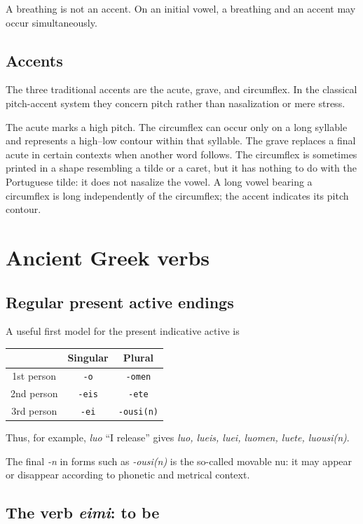 A breathing is not an accent.  On an initial vowel, a breathing and an accent
may occur simultaneously.

\subsection{Accents}
\label{subsection-accents}

The three traditional accents are the acute, grave, and circumflex.  In the
classical pitch-accent system they concern pitch rather than nasalization or
mere stress.

The acute marks a high pitch.  The circumflex can occur only on a long
syllable and represents a high--low contour within that syllable.  The grave
replaces a final acute in certain contexts when another word follows.  The
circumflex is sometimes printed in a shape resembling a tilde or a caret, but
it has nothing to do with the Portuguese tilde: it does not nasalize the
vowel.  A long vowel bearing a circumflex is long independently of the
circumflex; the accent indicates its pitch contour.

\section{Ancient Greek verbs}
\label{section-ancient-greek-verbs}

\subsection{Regular present active endings}
\label{subsection-present-active-endings}

A useful first model for the present indicative active is
\begin{center}
\begin{tabular}{c|cc}
 & Singular & Plural \\
\hline
1st person & \texttt{-o} & \texttt{-omen} \\
2nd person & \texttt{-eis} & \texttt{-ete} \\
3rd person & \texttt{-ei} & \texttt{-ousi(n)}
\end{tabular}
\end{center}
Thus, for example, \emph{luo} ``I release'' gives \emph{luo, lueis, luei,
luomen, luete, luousi(n)}.

The final \emph{-n} in forms such as \emph{-ousi(n)} is the so-called movable
nu: it may appear or disappear according to phonetic and metrical context.

\subsection{The verb \emph{eimi}: to be}
\label{subsection-verb-eimi}

